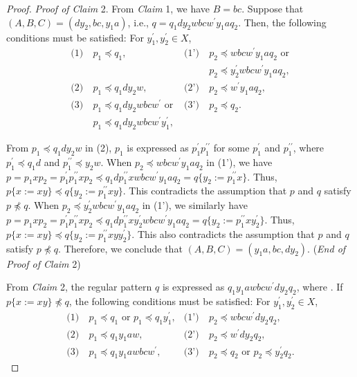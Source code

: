 \begin{proof}
  \smallskip
  \noindent
  \textit{Proof of Claim} 2.
  From \textit{Claim} 1, we have $B=bc$. Suppose that $(A, B, C) = (dy_{2}, bc, y_{1}a)$, i.e., $q = q_{1}dy_{2}wbcw^{\prime}y_{1}aq_{2} $.
  Then, the following conditions must be satisfied: For $y_{1}^{\prime},y_{2}^{\prime}\in X$,
  \begin{align*}
  \textrm{(1)}~& p_{1} \preceq q_{1}, & \textrm{(1')}~& p_{2} \preceq wbcw^{\prime}y_{1}aq_{2}\mbox{ or}\\
  & & & p_{2} \preceq y_{2}^{\prime}wbcw^{\prime}y_{1}aq_{2},\\
  \textrm{(2)}~& p_{1} \preceq q_{1}dy_{2}w, & \textrm{(2')}~& p_{2} \preceq w^{\prime}y_{1}aq_{2}, \\
  \textrm{(3)}~& p_{1} \preceq q_{1}dy_{2}wbcw^{\prime}\mbox{ or } & \textrm{(3')}~& p_{2} \preceq q_{2}.\\
  & p_{1} \preceq q_{1}dy_{2}wbcw^{\prime}y_{1}^{\prime},& &
  \end{align*}
 
  From $p_{1} \preceq q_{1}dy_{2}w$ in (2), $p_{1}$ is expressed as $p^{\prime}_{1}p^{\prime\prime}_{1}$ for some $p^{\prime}_{1}$ and $p^{\prime\prime}_{1}$, where $p^{\prime}_{1} \preceq q_{1}d$ and $p^{\prime\prime}_{1} \preceq y_{2}w$. 
  When $p_{2} \preceq wbcw^{\prime}y_{1}aq_{2}$ in (1'), we have $p=p_{1}xp_{2}=p^{\prime}_{1}p^{\prime\prime}_{1}xp_{2} \preceq q_{1}dp^{\prime\prime}_{1}xwbcw^{\prime}y_{1}aq_{2}=q \{ y_{2}:=p^{\prime\prime}_{1}x \}$.
  Thus, $p \{ x := xy \} \preceq q \{ y_{2}:=p^{\prime\prime}_{1}xy \}$.
  {\color{black}This contradicts the assumption that $p$ and $q$ satisfy 
  $p\not\preceq q$.}
  When $p_{2} \preceq y_{2}^{\prime}wbcw^{\prime}y_{1}aq_{2}$ in (1'), we similarly have $p=p_{1}xp_{2}=p^{\prime}_{1}p^{\prime\prime}_{1}xp_{2} \preceq q_{1}dp^{\prime\prime}_{1}xy_{2}^{\prime}wbcw^{\prime}y_{1}aq_{2}=q \{ y_{2}:=p^{\prime\prime}_{1}xy_{2}^{\prime} \}$.
  Thus, $p \{ x := xy \} \preceq q \{ y_{2}:=p^{\prime\prime}_{1}xyy_{2}^{\prime} \}$.
  {\color{black}This also contradicts the assumption that $p$ and $q$ satisfy 
  $p\not\preceq q$.}
  Therefore, we conclude that $(A, B, C) = (y_{1}a, bc, dy_{2})$.
  (\textit{End of Proof of Claim} 2)

  \smallskip

  From \textit{Claim} 2, {\color{black}the} regular pattern $q$ is expressed as $q_{1}y_{1}awbcw^{\prime}dy_{2}q_{2}$, where \TheConditionA.
  If $p \{ x := xy \} \not \preceq q$, the following conditions must be satisfied:
  For $y_{1}^{\prime},y_{2}^{\prime}\in X$,
  \begin{align*}
    \textrm{(1)}~& p_{1} \preceq q_{1} \mbox{ or } p_{1} \preceq q_{1}y_{1}^{\prime}, & \textrm{(1')}~& p_{2} \preceq wbcw^{\prime}dy_{2}q_{2}, \\
    \textrm{(2)}~& p_{1} \preceq q_{1}y_{1}aw, & \textrm{(2')}~& p_{2} \preceq w^{\prime}dy_{2}q_{2}, \\
    \textrm{(3)}~& p_{1} \preceq q_{1}y_{1}awbcw^{\prime}, & \textrm{(3')}~& p_{2} \preceq q_{2} \mbox{ or } p_{2} \preceq y_{2}^{\prime}q_{2}.
  \end{align*}


\end{proof}
